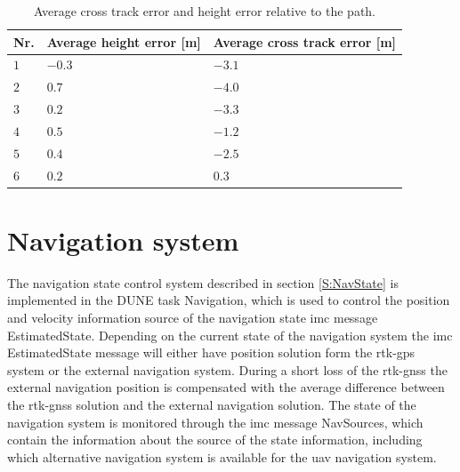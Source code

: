 \begin{table}[H]
\centering
\begin{tabular}{| l | l | l |}
\hline
\textbf{Nr.} 	& \textbf{Average height error [m]} 	& \textbf{Average cross track error [m]}  \\ \hline
$1$				& $-0.3$							& $-3.1$								\\ \hline
$2$				& $0.7$							& $-4.0$								\\ \hline
$3$				& $0.2$							& $-3.3$								\\ \hline
$4$				& $0.5$							& $-1.2$								\\ \hline
$5$				& $0.4$							& $-2.5$								\\ \hline
$6$				& $0.2$							& $0.3$								\\ \hline
\end{tabular}
\caption{Average cross track error and height error relative to the path.}
\label{Tb:SILAverageCrossHeight}
\end{table}
\section{Navigation system}\label{IMP:NavSys}
The navigation state control system described in section \ref{S:NavState} is implemented in the DUNE task Navigation, which is used to control the position and velocity information source of the navigation state \gls{imc} message EstimatedState. Depending on the current state of the navigation system the \gls{imc} EstimatedState message will either have position solution form the \gls{rtk-gps} system or the external navigation system. During a short loss of the \gls{rtk-gnss} the external navigation position is compensated with the average difference between the \gls{rtk-gnss} solution and the external navigation solution. The state of the navigation system is monitored through the \gls{imc} message NavSources, which contain the information about the source of the state information, including which alternative navigation system is available for the \gls{uav} navigation system.
